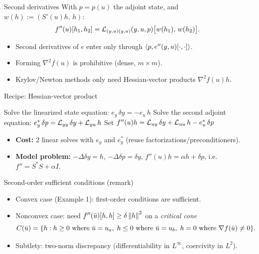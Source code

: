 \documentclass[main.tex]{subfiles}
\begin{document}
\begin{frame}{Second derivatives}
  With $p = p(u)$ the adjoint state, and $w(h) := (S'(u)h,\, h)$:
  \[
    f''(u)[h_1,h_2] = \mathcal{L}_{(y,u)(y,u)}(y,u,p)\big[w(h_1),\, w(h_2)\big] .
  \]
  \begin{itemize}
    \item Second derivatives of $e$ enter only through $\left\langle p, e''(y,u)[\cdot,\cdot] \right\rangle$.
    \item Forming $\nabla^2 f(u)$ is prohibitive (dense, $m\times m$).
    \item Krylov/Newton methods only need \alert{Hessian-vector products} $\nabla^2 f(u)h$.
  \end{itemize}
\end{frame}

\begin{frame}{Recipe: Hessian-vector product}
  \begin{algorithm}[H]
    \caption{Evaluate $f''(u)h$ (given $y = S(u)$, $p = p(u)$)}
    Solve the linearized state equation: $e_y\,\delta y = -e_u\,h$\;
    Solve the second adjoint equation: $e_y^*\,\delta p = \mathcal{L}_{yy}\,\delta y + \mathcal{L}_{yu}\,h$\;
    Set $f''(u)h = \mathcal{L}_{uy}\,\delta y + \mathcal{L}_{uu}\,h - e_u^*\,\delta p$\;
  \end{algorithm}
  \vspace{1ex}
  \begin{itemize}
    \item \textbf{Cost:} 2 linear solves with $e_y$ and $e_y^*$ (reuse factorizations/preconditioners).
    \item \textbf{Model problem:} $-\Delta\delta y = h$, \; $-\Delta\delta p = \delta y$, \; $f''(u)h = \alpha h + \delta p$, \; i.e.\ $f'' = S^*S + \alpha I$.
  \end{itemize}
\end{frame}

\begin{frame}{Second-order sufficient conditions (remark)}
  \begin{itemize}
    \item Convex case (Example 1): first-order conditions are sufficient.
    \item Nonconvex case: need $f''(\bar u)[h,h] \ge \delta\left\lVert h \right\rVert^2$ on a \emph{critical cone}
      \[
        C(\bar u) = \{ h : h \ge 0 \text{ where } \bar u = u_a,\; h \le 0 \text{ where } \bar u = u_b,\; h = 0 \text{ where } \nabla f(\bar u) \ne 0 \}.
      \]
    \item Subtlety: \alert{two-norm discrepancy} (differentiability in $L^\infty$, coercivity in $L^2$).
  \end{itemize}
\end{frame}
\end{document}
